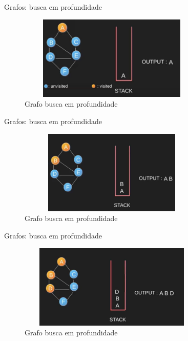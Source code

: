 \begin{frame}
	\begin{block}{Grafos: busca em profundidade}
		\begin{figure}[!htb]
			\centering	  
			\includegraphics[height=4cm, width = 9cm]{./pic/dfs2.png}
			\caption{Grafo busca em profundidade \cite{GEEKS_2018}}
		\end{figure}
	\end{block}
\end{frame}

\begin{frame}
	\begin{block}{Grafos: busca em profundidade}
		\begin{figure}[!htb]
			\centering	  
			\includegraphics[height=4cm, width = 9cm]{./pic/dfs3.png}
			\caption{Grafo busca em profundidade \cite{GEEKS_2018}}
		\end{figure}
	\end{block}
\end{frame}

\begin{frame}
	\begin{block}{Grafos: busca em profundidade}
		\begin{figure}[!htb]
			\centering	  
			\includegraphics[height=4cm, width = 9cm]{./pic/dfs4.png}
			\caption{Grafo busca em profundidade \cite{GEEKS_2018}}
		\end{figure}
	\end{block}
\end{frame}

